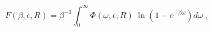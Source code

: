 \begin{equation}\label{2.22}
F(\beta,\epsilon,R)=\beta^{-1} \int_0^\infty \Phi(\omega,\epsilon,R)
~\ln\left(1-e^{-\beta\omega}\right)d\omega~,
\end{equation}

